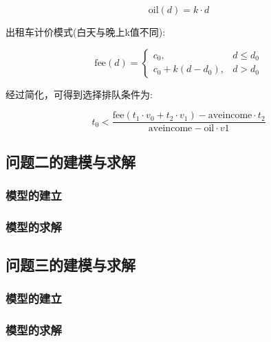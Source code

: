 \documentclass{cumcmthesis}
\begin{document}
$$\mathrm{oil}(d)=k\cdot d$$
\par
出租车计价模式(白天与晚上k值不同):\par
$$\mathrm{fee}(d)=\left\{
	\begin{array}{lcl}
		c_0,          & d\leq d_0 \\
		c_0+k(d-d_0), & d>d_0
	\end{array}
	\right.
$$
\par
经过简化，可得到选择排队条件为:\par
$$t_0<\frac{\mathrm{fee}(t_1\cdot v_0+t_2\cdot v_1)-\mathrm{aveincome}\cdot t_2}{\mathrm{aveincome}-\mathrm{oil}\cdot v1}$$

\subsection{问题二的建模与求解}

\subsubsection{模型的建立}

\subsubsection{模型的求解}


\newpage
\subsection{问题三的建模与求解}
\subsubsection{模型的建立}

\subsubsection{模型的求解}
\end{document}
